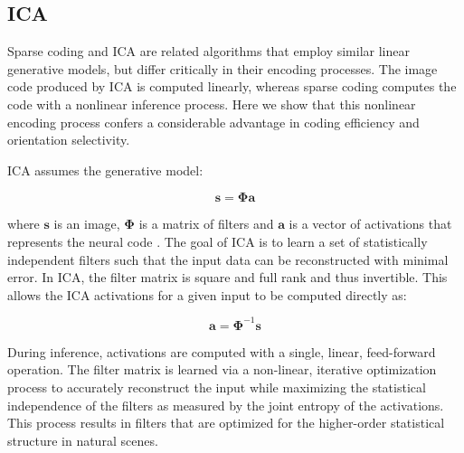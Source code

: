 

\subsection{ICA}
Sparse coding and ICA are related algorithms that employ similar linear generative models, but differ critically in their encoding processes. The image code produced by ICA is computed linearly, whereas sparse coding computes the code with a nonlinear inference process. Here we show that this nonlinear encoding process confers a considerable advantage in coding efficiency and orientation selectivity.

ICA assumes the generative model:

\begin{equation}\label{eq:ch2_ica_generative_model}
  \mathbf{s} = \mathbf{\Phi a}
\end{equation}

where $\mathbf{s}$ is an image, $\mathbf{\Phi}$ is a matrix of filters and $\mathbf{a}$ is a vector of activations that represents the neural code \parencite{bell1997independent}. The goal of ICA is to learn a set of statistically independent filters such that the input data can be reconstructed with minimal error. In ICA, the filter matrix is square and full rank and thus invertible. This allows the ICA activations for a given input to be computed directly as:

\begin{equation}
\mathbf{\hat{a}} = \mathbf{\Phi}^{-1}\mathbf{s}
\end{equation}

During inference, activations are computed with a single, linear, feed-forward operation. The filter matrix is learned via a non-linear, iterative optimization process to accurately reconstruct the input while maximizing the statistical independence of the filters as measured by the joint entropy of the activations. This process results in filters that are optimized for the higher-order statistical structure in natural scenes.

